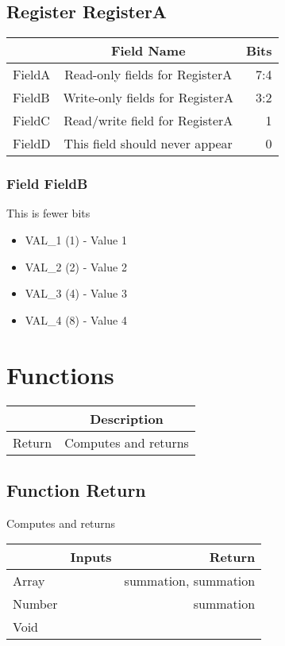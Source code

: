 \documentclass[a4paper,12pt,oneside,pdflatex,italian,final,twocolumn]{article}
\begin{document}
 


\raggedright

\subsection{Register RegisterA}
\centering
\begin{tabular}{lcr}
\toprule
  & Field Name & Bits \\
\midrule
FieldA & Read-only fields for RegisterA & 
7:4
\\
FieldB & Write-only fields for RegisterA & 
3:2
\\
FieldC & Read/write field for RegisterA & 
1
\\
FieldD & This field should never appear & 
0
\\
\bottomrule

\end{tabular}


\raggedright

\subsubsection{Field FieldB }

This is fewer bits

\begin{itemize}
\item VAL\_1 (1) - Value 1
\item VAL\_2 (2) - Value 2
\item VAL\_3 (4) - Value 3
\item VAL\_4 (8) - Value 4
\end{itemize}




\raggedright

\section{Functions}

\centering
\begin{tabular}{lc}
\toprule
  & Description \\
\midrule
Return & Computes and returns \\
\bottomrule
\end{tabular}


\raggedright
\subsection{Function Return }
Computes and returns \\

\centering
\begin{tabular}{lcr}
\toprule
  & Inputs & Return \\
\midrule
Array &
&
summation, 
summation
\\
Number &
&
summation
\\
Void &
&
\\
\bottomrule
\end{tabular}



\raggedright
\end{document}
